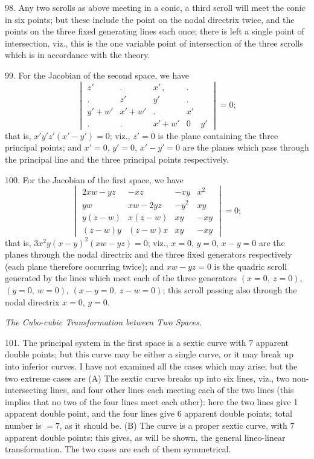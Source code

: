 \documentclass[11pt]{article}
\begin{document}
\medskip

98. Any two scrolls as above meeting in a conic, a third scroll will meet the
conic in six points; but these include the point on the nodal directrix twice, and
the points on the three fixed generating lines each once; there is left a single point
of intersection, viz., this is the one variable point of intersection of the three scrolls
which is in accordance with the theory.

99. For the Jacobian of the second space, we have
\[ \begin{vmatrix} z' & .\ & x'\,, & . \\ .\ & z' & y' & . \\ y'+w' & x'+w' & .\ & x' \\ . & . & x'+w' & 0 & y' \end{vmatrix} = 0; \]
that is, $x'y'z'(x'-y')=0$; viz., $z'=0$ is the plane containing the three principal
points; and $x'=0$, $y'=0$, $x'-y'=0$ are the planes which pass through the principal
line and the three principal points respectively.

100. For the Jacobian of the first space, we have
\[ \begin{vmatrix} 2xw - yz & -xz & -xy & x^2 \\ yw & xw - 2yz & -y^2 & xy \\ y(z-w) & x(z-w) & xy & -xy \\ (z-w)y & (z-w)x & xy & -xy \end{vmatrix} = 0; \]
that is, $3x^2y(x-y)^2(xw-yz)=0$; viz., $x=0$, $y=0$, $x-y=0$ are the planes through the
nodal directrix and the three fixed generators respectively (each plane therefore occurring
twice); and $xw - yz = 0$ is the quadric scroll generated by the lines which meet each
of the three generators $(x=0,\ z=0)$, $(y=0,\ w=0)$, $(x-y=0,\ z-w=0)$; this scroll
passing also through the nodal directrix $x=0$, $y=0$.

\medskip
\begin{center}\textit{The Cubo-cubic Transformation between Two Spaces.}\end{center}

101. The principal system in the first space is a sextic curve with 7 apparent
double points; but this curve may be either a single curve, or it may break up into
inferior curves. I have not examined all the cases which may arise; but the two
extreme cases are (A) The sextic curve breaks up into six lines, viz., two non-inter\-secting lines, and four other lines each meeting each of the two lines (this
implies that no two of the four lines meet each other): here the two lines give
1 apparent double point, and the four lines give 6 apparent double points; total
number is $=7$, as it should be. (B) The curve is a proper sextic curve, with
7 apparent double points: this gives, as will be shown, the general lineo-linear trans\-formation. The two cases are each of them symmetrical.
\end{document}

